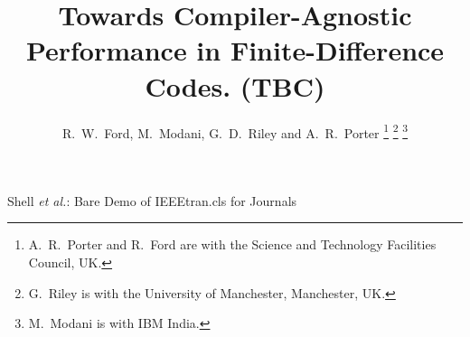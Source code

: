 \documentclass[journal]{IEEEtran}
\begin{document}
%
\title{Towards Compiler-Agnostic Performance in Finite-Difference Codes. (TBC)}
%
%

\author{R.~W.~Ford, M.~Modani, G.~D.~Riley and A.~R.~Porter%
\thanks{A.~R.~Porter and R.~Ford are with the Science and Technology Facilities Council, UK.}%
\thanks{G.~Riley is with the University of Manchester, Manchester, UK.}%
\thanks{M.~Modani is with IBM India.}
}

% 
%


%
{Shell \MakeLowercase{\textit{et al.}}: Bare Demo of IEEEtran.cls for Journals}
% 




\end{document}
